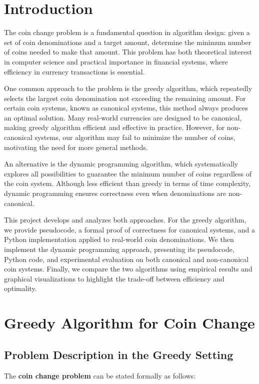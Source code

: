 \documentclass[12pt,a4paper]{report}
\begin{document}
\chapter{Introduction \centering}
The coin change problem is a fundamental question in algorithm design: given a set of coin denominations and a target amount, determine the minimum number of coins needed to make that amount. This problem has both theoretical interest in computer science and practical importance in financial systems, where efficiency in currency transactions is essential.

One common approach to the problem is the greedy algorithm, which repeatedly selects the largest coin denomination not exceeding the remaining amount. For certain coin systems, known as canonical systems, this method always produces an optimal solution. Many real-world currencies are designed to be canonical, making greedy algorithm efficient and effective in practice. However, for non-canonical systems, our algorithm may fail to minimize the number of coins, motivating the need for more general methods.

An alternative is the dynamic programming algorithm, which systematically explores all possibilities to guarantee the minimum number of coins regardless of the coin system. Although less efficient than greedy in terms of time complexity, dynamic programming ensures correctness even when denominations are non-canonical.

This project develops and analyzes both approaches. For the greedy algorithm, we provide pseudocode, a formal proof of correctness for canonical systems, and a Python implementation applied to real-world coin denominations. We then implement the dynamic programming approach, presenting its pseudocode, Python code, and experimental evaluation on both canonical and non-canonical coin systems. Finally, we compare the two algorithms using empirical results and graphical visualizations to highlight the trade-off between efficiency and optimality.


\chapter{Greedy Algorithm for Coin Change\centering}
\section{Problem Description in the Greedy Setting}
\label{sec:greedy-algo}

The \textbf{coin change problem} can be stated formally as follows:
\end{document}
